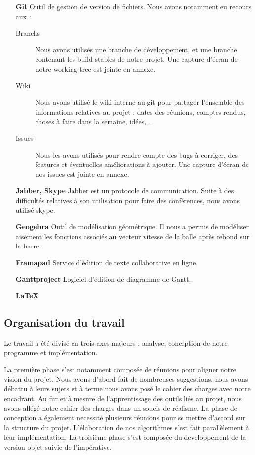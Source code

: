 \begin{enumerate}
    \item[\bf Git] Outil de gestion de version de fichiers. Nous avons notamment eu recours aux :
	\begin{description}
      \item[Branchs] Nous avons utilisés une branche de développement, et une branche contenant les build stables de notre projet. Une capture d'écran de notre working tree est jointe en annexe.
      \item[Wiki] Nous avons utilisé le wiki interne au git pour partager l'ensemble des informations relatives au projet : dates des réunions, comptes rendus, choses à faire dans la semaine, idées, ...
      \item[Issues] Nous les avons utilisés pour rendre compte des bugs à corriger, des features et éventuelles améliorations à ajouter. Une capture d'écran de nos issues est jointe en annexe.
    \end{description}
    \item[\bf Jabber, Skype]  Jabber est un protocole de communication. Suite à des difficultés relatives à son utilisation pour faire des conférences, nous avons utilisé skype.
    \item[\bf Geogebra] Outil de modélisation géométrique. Il nous a permis de modéliser aisément les fonctions associés au vecteur vitesse de la balle après rebond sur la barre.
    \item[\bf Framapad] Service d'édition de texte collaborative en ligne.
    \item[\bf Ganttproject] Logiciel d'édition de diagramme de Gantt.
    \item[\bf LaTeX]
  \end{enumerate}
\subsection{Organisation du travail} %
	Le travail a été divisé en trois axes majeurs : analyse, conception de notre programme et implémentation.
	
	La première phase s'est notamment composée de réunions pour aligner notre vision du projet. Nous avons d'abord fait de nombreuses suggestions, nous avons débattu à leurs sujets et à terme nous avons posé le cahier des charges avec notre encadrant. Au fur et à mesure de l'apprentissage des outils liés au projet, nous avons allégé notre cahier des charges dans un soucis de réalisme.
	La phase de conception a également necessité plusieurs réunions pour se mettre d'accord sur la structure du projet. L'élaboration de nos algorithmes s'est fait parallèlement à leur implémentation.
	La troisième phase s'est composée du developpement de la version objet suivie de l'impérative.
	
